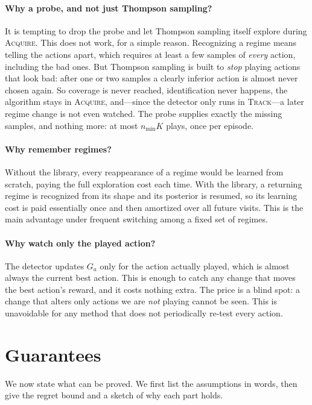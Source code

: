 \documentclass[11pt]{article}
\newcommand{\ACQ}{\textsc{Acquire}\xspace}
\newcommand{\TRACK}{\textsc{Track}\xspace}
\begin{document}
\paragraph{Why a probe, and not just Thompson sampling?}
It is tempting to drop the probe and let Thompson sampling itself explore during \ACQ. This does
not work, for a simple reason. Recognizing a regime means telling the actions apart, which
requires at least a few samples of \emph{every} action, including the bad ones. But Thompson
sampling is built to \emph{stop} playing actions that look bad: after one or two samples a clearly
inferior action is almost never chosen again. So coverage is never reached, identification never
happens, the algorithm stays in \ACQ, and---since the detector only runs in \TRACK---a later
regime change is not even watched. The probe supplies exactly the missing samples, and nothing
more: at most $n_{\min}K$ plays, once per episode.

\paragraph{Why remember regimes?}
Without the library, every reappearance of a regime would be learned from scratch, paying the full
exploration cost each time. With the library, a returning regime is recognized from its shape and
its posterior is resumed, so its learning cost is paid essentially once and then amortized over all
future visits. This is the main advantage under frequent switching among a fixed set of regimes.

\paragraph{Why watch only the played action?}
The detector updates $G_a$ only for the action actually played, which is almost always the current
best action. This is enough to catch any change that moves the best action's reward, and it costs
nothing extra. The price is a blind spot: a change that alters only actions we are \emph{not}
playing cannot be seen. This is unavoidable for any method that does not periodically re-test every
action.

\section{Guarantees}
\label{sec:regret}

We now state what can be proved. We first list the assumptions in words, then give the regret
bound and a sketch of why each part holds.
\end{document}
